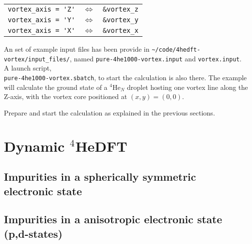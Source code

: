 \documentclass[10pt,a4paper]{article}
\begin{document}
	\begin{tabular}{ccc}
	\verb|vortex_axis = 'Z'|	& $\Longleftrightarrow$ & \verb|&vortex_z| \\
	\verb|vortex_axis = 'Y'|	& $\Longleftrightarrow$ & \verb|&vortex_y| \\
	\verb|vortex_axis = 'X'|	& $\Longleftrightarrow$ & \verb|&vortex_x| \\
	\end{tabular}

 	An set of example input files has been provide in \verb|~/code/4hedft-vortex/input_files/|, named \verb|pure-4he1000-vortex.input| and \verb|vortex.input|. A launch script,\\ \verb|pure-4he1000-vortex.sbatch|, to start the calculation is also there. The example will calculate the ground state of a $^4$He$_N$ droplet hosting one vortex line along the Z-axis, with the vortex core positioned at $(x,y)=(0,0)$.
 	
 	Prepare and start the calculation as explained in the previous sections.
	
	\newpage
	
	\section{Dynamic $^4$HeDFT}
	
	\subsection{Impurities in a spherically symmetric electronic state}
	\subsection{Impurities in a anisotropic electronic state (p,d-states)}
	
\end{document}
